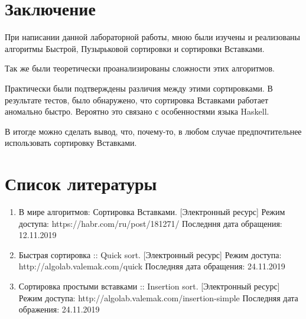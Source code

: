 \documentclass[12pt]{report}
\begin{document}
\chapter*{Заключение}

При написании данной лабораторной работы, мною были изучены и реализованы алгоритмы Быстрой, Пузырьковой сортировки и сортировки Вставками.

Так же были теоретически проанализированы сложности этих алгоритмов.

Практически были подтверждены различия между этими сортировками.
В результате тестов, было обнаружено, что сортировка Вставками работает аномально быстро.
Вероятно это связано с особенностями языка Haskell.

В итогде можно сделать вывод, что, почему-то, в любом случае предпочтительнее использовать сортировку Вставками.

\chapter*{Список литературы}
\begin{enumerate} 
	\item В мире алгоритмов: Сортировка Вставками. [Электронный ресурс] Режим доступа: https://habr.com/ru/post/181271/ Последння дата обращения: 12.11.2019
	\item Быстрая сортировка :: Quick sort. [Электронный ресурс] Режим доступа:
	http://algolab.valemak.com/quick Последняя дата обращения: 24.11.2019
	\item Сортировка простыми вставками :: Insertion sort. [Электронный ресурс] Режим доступа: http://algolab.valemak.com/insertion-simple Последняя дата ображения: 24.11.2019
\end{enumerate} 
\end{document}
